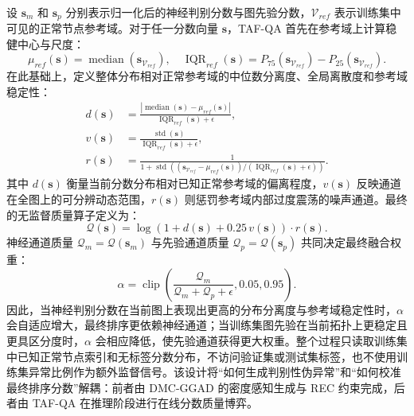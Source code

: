 ﻿﻿﻿﻿    \documentclass[conference, onecolumn]{IEEEtran}
\begin{document}
    设 $\mathbf{s}_{m}$ 和 $\mathbf{s}_{p}$ 分别表示归一化后的神经判别分数与图先验分数，$\mathcal{V}_{ref}$ 表示训练集中可见的正常节点参考域。对于任一分数向量 $\mathbf{s}$，TAF-QA 首先在参考域上计算稳健中心与尺度：
    \begin{equation}
    \mu_{ref}(\mathbf{s})=\operatorname{median}\left(\mathbf{s}_{\mathcal{V}_{ref}}\right), \quad
    \operatorname{IQR}_{ref}(\mathbf{s})=P_{75}\left(\mathbf{s}_{\mathcal{V}_{ref}}\right)-P_{25}\left(\mathbf{s}_{\mathcal{V}_{ref}}\right).
    \end{equation}
    在此基础上，定义整体分布相对正常参考域的中位数分离度、全局离散度和参考域稳定性：
    \begin{align}
    d(\mathbf{s}) &= \frac{\left|\operatorname{median}(\mathbf{s})-\mu_{ref}(\mathbf{s})\right|}{\operatorname{IQR}_{ref}(\mathbf{s})+\epsilon},\\
    v(\mathbf{s}) &= \frac{\operatorname{std}(\mathbf{s})}{\operatorname{IQR}_{ref}(\mathbf{s})+\epsilon},\\
    r(\mathbf{s}) &= \frac{1}{1+\operatorname{std}\left((\mathbf{s}_{\mathcal{V}_{ref}}-\mu_{ref}(\mathbf{s}))/(\operatorname{IQR}_{ref}(\mathbf{s})+\epsilon)\right)}.
    \end{align}
    其中 $d(\mathbf{s})$ 衡量当前分数分布相对已知正常参考域的偏离程度，$v(\mathbf{s})$ 反映通道在全图上的可分辨动态范围，$r(\mathbf{s})$ 则惩罚参考域内部过度震荡的噪声通道。最终的无监督质量算子定义为：
    \begin{equation}
    \mathcal{Q}(\mathbf{s})=
    \log\left(1+d(\mathbf{s})+0.25\,v(\mathbf{s})\right)\cdot r(\mathbf{s}).
    \end{equation}
    神经通道质量 $\mathcal{Q}_{m}=\mathcal{Q}(\mathbf{s}_{m})$ 与先验通道质量 $\mathcal{Q}_{p}=\mathcal{Q}(\mathbf{s}_{p})$ 共同决定最终融合权重：
    \begin{equation}
    \alpha =
    \operatorname{clip}\left(
    \frac{\mathcal{Q}_{m}}{\mathcal{Q}_{m}+\mathcal{Q}_{p}+\epsilon},
    0.05, 0.95
    \right).
    \end{equation}
    因此，当神经判别分数在当前图上表现出更高的分布分离度与参考域稳定性时，$\alpha$ 会自适应增大，最终排序更依赖神经通道；当训练集图先验在当前拓扑上更稳定且更具区分度时，$\alpha$ 会相应降低，使先验通道获得更大权重。整个过程只读取训练集中已知正常节点索引和无标签分数分布，不访问验证集或测试集标签，也不使用训练集异常比例作为额外监督信号。该设计将“如何生成判别性伪异常”和“如何校准最终排序分数”解耦：前者由 DMC-GGAD 的密度感知生成与 REC 约束完成，后者由 TAF-QA 在推理阶段进行在线分数质量博弈。
\end{document}

